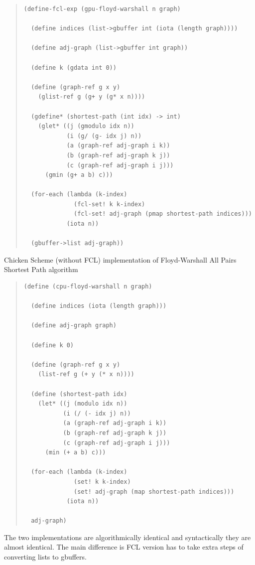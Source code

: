 \documentclass{article}
\begin{document}
{\begin{quote}
\begin{verbatim}
(define-fcl-exp (gpu-floyd-warshall n graph)

  (define indices (list->gbuffer int (iota (length graph))))

  (define adj-graph (list->gbuffer int graph))

  (define k (gdata int 0))

  (define (graph-ref g x y)
    (glist-ref g (g+ y (g* x n))))

  (gdefine* (shortest-path (int idx) -> int)
    (glet* ((j (gmodulo idx n))
            (i (g/ (g- idx j) n))
            (a (graph-ref adj-graph i k))
            (b (graph-ref adj-graph k j))
            (c (graph-ref adj-graph i j)))
      (gmin (g+ a b) c)))

  (for-each (lambda (k-index)
              (fcl-set! k k-index)
              (fcl-set! adj-graph (pmap shortest-path indices)))
            (iota n))

  (gbuffer->list adj-graph))
\end{verbatim}
\end{quote}

\raggedright{} {
Chicken Scheme (without FCL) implementation of Floyd-Warshall
All Pairs Shortest Path algorithm
}

\begin{quote}
\begin{verbatim}
(define (cpu-floyd-warshall n graph)

  (define indices (iota (length graph)))

  (define adj-graph graph)

  (define k 0)

  (define (graph-ref g x y)
    (list-ref g (+ y (* x n))))

  (define (shortest-path idx)
    (let* ((j (modulo idx n))
           (i (/ (- idx j) n))
           (a (graph-ref adj-graph i k))
           (b (graph-ref adj-graph k j))
           (c (graph-ref adj-graph i j)))
      (min (+ a b) c)))

  (for-each (lambda (k-index)
              (set! k k-index)
              (set! adj-graph (map shortest-path indices)))
            (iota n))

  adj-graph)
\end{verbatim}
\end{quote}

{\raggedright{}
  The two implementations are algorithmically identical and syntactically they
  are almost identical. The main difference is FCL version has to take extra
  steps of converting lists to gbuffers.

}}
\end{document}
